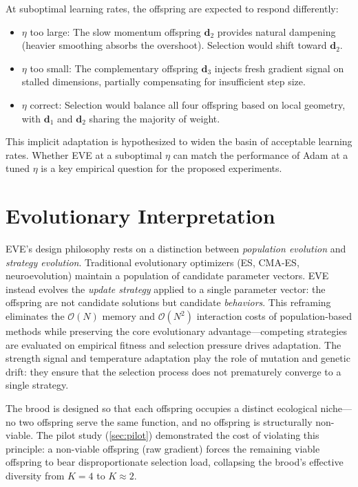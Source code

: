 \documentclass[12pt]{article}
\begin{document}
At suboptimal learning rates, the offspring are expected to respond
differently:
\begin{itemize}[leftmargin=1.6em, itemsep=3pt]
  \item $\eta$ too large: The slow momentum offspring $\mathbf{d}_2$
    provides natural dampening (heavier smoothing absorbs the
    overshoot). Selection would shift toward $\mathbf{d}_2$.
  \item $\eta$ too small: The complementary offspring $\mathbf{d}_3$
    injects fresh gradient signal on stalled dimensions, partially
    compensating for insufficient step size.
  \item $\eta$ correct: Selection would balance all four offspring
    based on local geometry, with $\mathbf{d}_1$ and $\mathbf{d}_2$
    sharing the majority of weight.
\end{itemize}

This implicit adaptation is hypothesized to widen the basin of
acceptable learning rates.
Whether EVE at a suboptimal $\eta$ can match the performance of Adam at
a tuned $\eta$ is a key empirical question for the proposed experiments.


\section{Evolutionary Interpretation}
\label{sec:evolutionary}

EVE's design philosophy rests on a distinction between
\emph{population evolution} and \emph{strategy evolution}.
Traditional evolutionary optimizers (ES, CMA-ES, neuroevolution)
maintain a population of candidate parameter vectors.
EVE instead evolves the \emph{update strategy} applied to a single
parameter vector: the offspring are not candidate solutions but
candidate \emph{behaviors}.
This reframing eliminates the $\mathcal{O}(N)$ memory and
$\mathcal{O}(N^2)$ interaction costs of population-based methods
while preserving the core evolutionary advantage---competing strategies
are evaluated on empirical fitness and selection pressure drives
adaptation.
The strength signal and temperature adaptation play the role of
mutation and genetic drift: they ensure that the selection process
does not prematurely converge to a single strategy.

The brood is designed so that each offspring occupies a distinct
ecological niche---no two offspring serve the same function, and
no offspring is structurally non-viable.
The pilot study (\cref{sec:pilot}) demonstrated the cost of
violating this principle: a non-viable offspring (raw gradient)
forces the remaining viable offspring to bear disproportionate
selection load, collapsing the brood's effective diversity from
$K = 4$ to $K \approx 2$.
\end{document}
